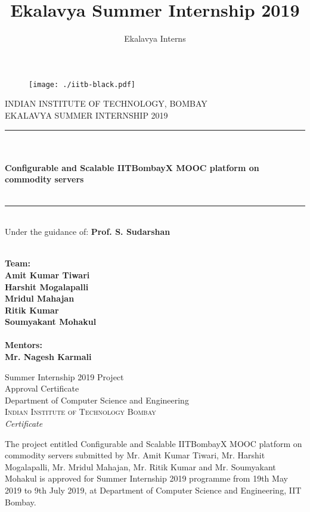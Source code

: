 \documentclass[12pt]{report}
\title{Ekalavya Summer Internship 2019}
\author{Ekalavya Interns}
\begin{document}
	\begin{titlepage}
		\begin{center}
			\begin{figure}[h]
				\centering
				\texttt{[image: ./iitb-black.pdf]}
			\end{figure}
			
			INDIAN INSTITUTE OF TECHNOLOGY, BOMBAY\\
			EKALAVYA SUMMER INTERNSHIP 2019\\ 
			\noindent\rule{15cm}{0.4pt}\\
			\textbf{\huge \\Configurable and Scalable IITBombayX MOOC platform on commodity servers}\\
			\textbf{}\\
			\noindent\rule{15cm}{0.4pt}
			\newline
			\\Under the guidance of: \textbf{Prof. S. Sudarshan}
			\begin{multicols}{2}
				\textbf{\\ \large
					\textbf{Team:} \\
					\textbf{Amit Kumar Tiwari}\\
					\textbf{Harshit Mogalapalli}\\
					\textbf{Mridul Mahajan}\\
					\textbf{Ritik Kumar}\\
					\textbf{Soumyakant Mohakul}\\
				}
				\columnbreak
				\textbf{\\ \large
					\textbf{Mentors:}\\
					\textbf{Mr. Nagesh Karmali}
				}
			\end{multicols}
			
		\end{center}
	\end{titlepage}
	
	\pagebreak
	\newpage
	\thispagestyle{empty}
	
	\begin{center}
		\huge{Summer Internship 2019 Project}\\[0.5cm]
		Approval Certificate\\[1.0cm]
		\huge{Department of Computer Science and Engineering}\\[0.5cm]
		\normalsize
		\textsc{Indian Institute of Technology Bombay}\\[2.0cm]
		
		\emph{\LARGE Certificate}\\[2.5cm]
	\end{center}
	\normalsize The project entitled Configurable and Scalable IITBombayX MOOC platform on commodity servers submitted by Mr. Amit Kumar Tiwari, Mr. Harshit Mogalapalli, Mr. Mridul Mahajan, Mr. Ritik Kumar and Mr. Soumyakant Mohakul is approved for Summer Internship 2019 programme from 19th May 2019 to 9th July 2019, at Department of Computer Science
	and Engineering, IIT Bombay.\\[1.0cm]
	
\end{document}

